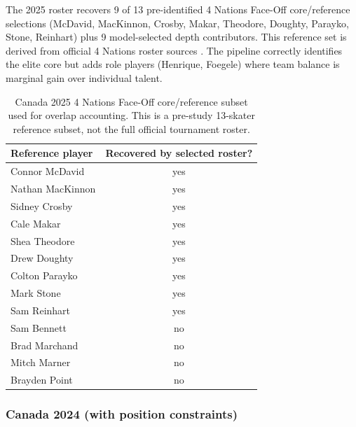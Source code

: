 \documentclass[11pt,letterpaper]{article}
\begin{document}
The 2025 roster recovers 9 of 13 pre-identified 4 Nations Face-Off
core/reference selections
(McDavid, MacKinnon, Crosby, Makar, Theodore, Doughty, Parayko, Stone,
Reinhart) plus 9 model-selected depth contributors. This reference set
is derived from official 4 Nations roster sources
\cite{hockeyCanada4Nations,nhlFourNationsRosters}. The pipeline
correctly identifies the elite core but adds role players (Henrique,
Foegele) where team balance is marginal gain over individual talent.

\begin{table}[h]
  \centering
  \small
  \caption{Canada 2025 4 Nations Face-Off core/reference subset used
    for overlap accounting. This is a pre-study 13-skater reference
    subset, not the full official tournament roster.}
  \begin{tabular}{l c}
    \toprule
    Reference player & Recovered by selected roster? \\
    \midrule
    Connor McDavid & yes \\
    Nathan MacKinnon & yes \\
    Sidney Crosby & yes \\
    Cale Makar & yes \\
    Shea Theodore & yes \\
    Drew Doughty & yes \\
    Colton Parayko & yes \\
    Mark Stone & yes \\
    Sam Reinhart & yes \\
    Sam Bennett & no \\
    Brad Marchand & no \\
    Mitch Marner & no \\
    Brayden Point & no \\
    \bottomrule
  \end{tabular}
\end{table}

\subsubsection{Canada 2024 (with position constraints)}
\end{document}
